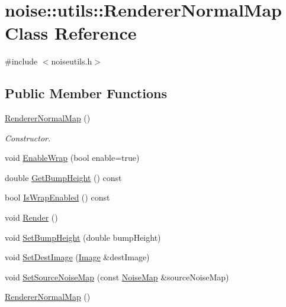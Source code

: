 \hypertarget{classnoise_1_1utils_1_1_renderer_normal_map}{\section{noise\+:\+:utils\+:\+:Renderer\+Normal\+Map Class Reference}
\label{classnoise_1_1utils_1_1_renderer_normal_map}
}


{\ttfamily \#include $<$noiseutils.\+h$>$}

\subsection*{Public Member Functions}
\begin{DoxyCompactItemize}
\item 
\hyperlink{classnoise_1_1utils_1_1_renderer_normal_map_ab960e0064ecc53d702566d3b8d7c0911}{Renderer\+Normal\+Map} ()
\begin{DoxyCompactList}\small\item\em Constructor. \end{DoxyCompactList}\item 
void \hyperlink{classnoise_1_1utils_1_1_renderer_normal_map_a3a998d79c28c5a302e71f3f9e512019e}{Enable\+Wrap} (bool enable=true)
\item 
double \hyperlink{classnoise_1_1utils_1_1_renderer_normal_map_a7934a97f130810598618d9a4fb75e4d8}{Get\+Bump\+Height} () const 
\item 
bool \hyperlink{classnoise_1_1utils_1_1_renderer_normal_map_a4b3ad9693bfab047e34a015139b9ccdc}{Is\+Wrap\+Enabled} () const 
\item 
void \hyperlink{classnoise_1_1utils_1_1_renderer_normal_map_a4c99c9a3ebab17b5f2e0ff9b41d96cdf}{Render} ()
\item 
void \hyperlink{classnoise_1_1utils_1_1_renderer_normal_map_acd9108556c634f1f7ed7a29978861cf8}{Set\+Bump\+Height} (double bump\+Height)
\item 
void \hyperlink{classnoise_1_1utils_1_1_renderer_normal_map_ae897dedd021446330d2b2ea619008acc}{Set\+Dest\+Image} (\hyperlink{classnoise_1_1utils_1_1_image}{Image} \&dest\+Image)
\item 
void \hyperlink{classnoise_1_1utils_1_1_renderer_normal_map_a89c35a7cd1b307da714c7389d56c57db}{Set\+Source\+Noise\+Map} (const \hyperlink{classnoise_1_1utils_1_1_noise_map}{Noise\+Map} \&source\+Noise\+Map)
\item 
\hyperlink{classnoise_1_1utils_1_1_renderer_normal_map_af8278181daa0404e0d5a847593c82de4}{Renderer\+Normal\+Map} ()

\end{DoxyCompactItemize}
